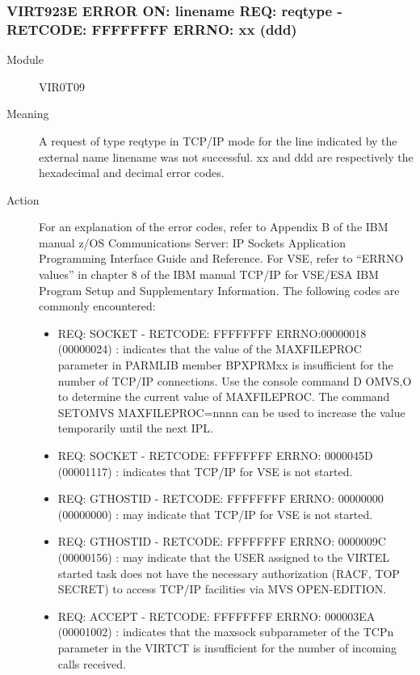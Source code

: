 \documentclass[letterpaper,10pt,english]{sphinxmanual}
\begin{document}
\subsubsection{VIRT923E ERROR ON: linename REQ: reqtype - RETCODE: FFFFFFFF ERRNO: xx (ddd)}
\label{\detokenize{messages:virt923e-error-on-linename-req-reqtype-retcode-ffffffff-errno-xx-ddd}}\begin{description}
\item[{Module}] \leavevmode
VIR0T09

\item[{Meaning}] \leavevmode
A request of type reqtype in TCP/IP mode for the line indicated by the external name linename was not successful. xx and ddd are respectively the hexadecimal and decimal error codes.

\item[{Action}] \leavevmode
For an explanation of the error codes, refer to Appendix B of the IBM manual z/OS Communications Server: IP Sockets Application Programming Interface Guide and Reference. For VSE, refer to “ERRNO values” in chapter 8 of the IBM manual TCP/IP for VSE/ESA IBM Program Setup and Supplementary Information.
The following codes are commonly encountered:
\begin{itemize}
\item {} 
REQ: SOCKET - RETCODE: FFFFFFFF ERRNO:00000018 (00000024) : indicates that the value of the MAXFILEPROC parameter in PARMLIB member BPXPRMxx is insufficient for the number of TCP/IP connections. Use the console command D OMVS,O to determine the current value of MAXFILEPROC. The command SETOMVS MAXFILEPROC=nnnn can be used to increase the value temporarily until the next IPL.

\item {} 
REQ: SOCKET - RETCODE: FFFFFFFF ERRNO: 0000045D (00001117) : indicates that TCP/IP for VSE is not started.

\item {} 
REQ: GTHOSTID - RETCODE: FFFFFFFF ERRNO: 00000000 (00000000) : may indicate that TCP/IP for VSE is not started.

\item {} 
REQ: GTHOSTID - RETCODE: FFFFFFFF ERRNO: 0000009C (00000156) : may indicate that the USER assigned to the VIRTEL started task does not have the necessary authorization (RACF, TOP SECRET) to access TCP/IP facilities via MVS OPEN-EDITION.

\item {} 
REQ: ACCEPT - RETCODE: FFFFFFFF ERRNO: 000003EA (00001002) : indicates that the maxsock subparameter of the TCPn parameter in the VIRTCT is insufficient for the number of incoming calls received.


\end{itemize}
\end{description}
\end{document}
